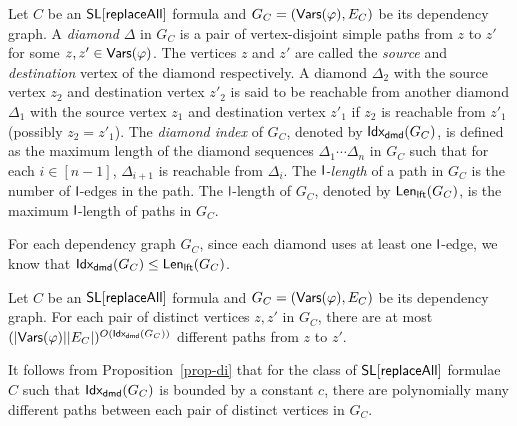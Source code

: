 \begin{definition}
Let $C$  be an  $\mathsf{SL}[\mathsf{replaceAll}]$ formula and $G_C=(\mathsf{Vars}(\varphi), E_C)$ be its dependency graph. A \emph{diamond} $\Delta$ in $G_C$ is a pair of vertex-disjoint simple paths from $z$ to $z'$ for some $z,z' \in \mathsf{Vars}(\varphi)$. The vertices $z$ and $z'$ are called the \emph{source} and \emph{destination} vertex of the diamond respectively. A diamond $\Delta_2$ with the source vertex $z_2$ and destination vertex $z'_2$ is said to be reachable from  another diamond $\Delta_1$ with the source vertex $z_1$ and destination vertex $z'_1$ if $z_2$ is reachable from $z'_1$ (possibly $z_2= z'_1$). The \emph{diamond index} of $G_C$, denoted by ${\sf Idx_{dmd}}(G_C)$, is defined as the maximum length of the diamond sequences $\Delta_1 \cdots \Delta_n$ in $G_C$ such that for each $i \in [n-1]$, $\Delta_{i+1}$ is reachable from $\Delta_i$. The \emph{$\mathsf{l}$-length} of a path in $G_C$ is the number of $\mathsf{l}$-edges in the path. The $\mathsf{l}$-length of $G_C$, denoted by ${\sf Len_{lft}}(G_C)$, is the maximum $\mathsf{l}$-length of paths in $G_C$.
\end{definition}
For each dependency graph $G_C$, since each diamond uses at least one $\mathsf{l}$-edge, we know that ${\sf Idx_{dmd}}(G_C) \le {\sf Len_{lft}}(G_C)$.

\begin{proposition}\label{prop-di}
Let $C$  be an  $\mathsf{SL}[\mathsf{replaceAll}]$ formula and $G_C=(\mathsf{Vars}(\varphi), E_C)$ be its dependency graph. For each pair of distinct vertices $z,z'$ in $G_C$, there are at most $(|\mathsf{Vars}(\varphi)||E_C|)^{O({\sf Idx_{dmd}}(G_C))}$ different paths from $z$ to $z'$.
\end{proposition}
It follows from Proposition~\ref{prop-di} that for the class of $\mathsf{SL}[\mathsf{replaceAll}]$ formulae $C$ such that ${\sf Idx_{dmd}}(G_C)$ is bounded by a constant $c$,  there are polynomially many different paths between each pair of distinct vertices in $G_C$.

